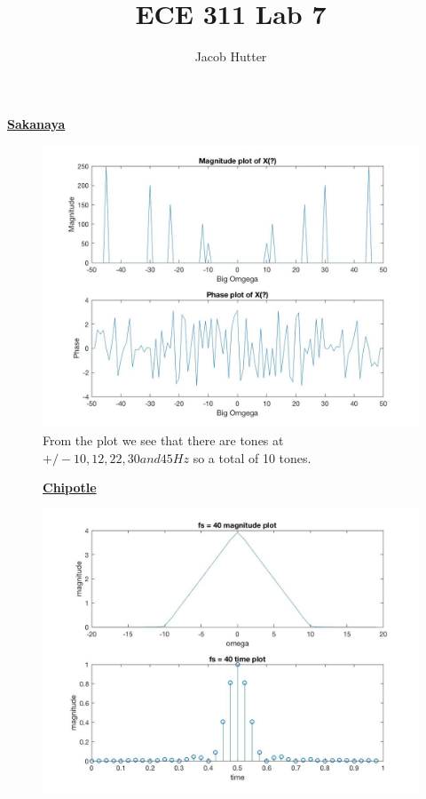 \documentclass{article}
\author{Jacob Hutter}
\title{ECE 311 Lab 7}
\begin{document}
\maketitle

\color{red}
\underline{\textbf{Sakanaya}}
\color{black}
\begin{figure}[H]

\includegraphics[scale=.5]{Sakanaya1}
From the plot we see that there are tones at $+/- 10,12,22,30 and 45 Hz$ so a total of 10 tones.
\end{figure}


\begin{figure}[H]
  \color{red}
  \underline{\textbf{Chipotle}}
  \color{black}

\includegraphics[scale=.5]{Chipotle1}
\end{figure}
\end{document}
